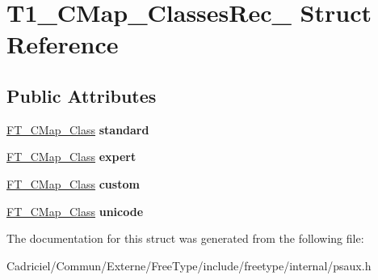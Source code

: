 \hypertarget{struct_t1___c_map___classes_rec__}{}\section{T1\+\_\+\+C\+Map\+\_\+\+Classes\+Rec\+\_\+ Struct Reference}
\label{struct_t1___c_map___classes_rec__}
\subsection*{Public Attributes}
\begin{DoxyCompactItemize}
\item 
\hyperlink{struct_f_t___c_map___class_rec__}{F\+T\+\_\+\+C\+Map\+\_\+\+Class} {\bfseries standard}\hypertarget{struct_t1___c_map___classes_rec___a11bc9e986af1c0cf91bd67e2e30028ca}{}\label{struct_t1___c_map___classes_rec___a11bc9e986af1c0cf91bd67e2e30028ca}

\item 
\hyperlink{struct_f_t___c_map___class_rec__}{F\+T\+\_\+\+C\+Map\+\_\+\+Class} {\bfseries expert}\hypertarget{struct_t1___c_map___classes_rec___a9576c404d5197dd66498725eacde1302}{}\label{struct_t1___c_map___classes_rec___a9576c404d5197dd66498725eacde1302}

\item 
\hyperlink{struct_f_t___c_map___class_rec__}{F\+T\+\_\+\+C\+Map\+\_\+\+Class} {\bfseries custom}\hypertarget{struct_t1___c_map___classes_rec___a21378ef457d58cc00f357011f45fba5e}{}\label{struct_t1___c_map___classes_rec___a21378ef457d58cc00f357011f45fba5e}

\item 
\hyperlink{struct_f_t___c_map___class_rec__}{F\+T\+\_\+\+C\+Map\+\_\+\+Class} {\bfseries unicode}\hypertarget{struct_t1___c_map___classes_rec___aab1eef66893dd7b0d25897612d056d4a}{}\label{struct_t1___c_map___classes_rec___aab1eef66893dd7b0d25897612d056d4a}

\end{DoxyCompactItemize}


The documentation for this struct was generated from the following file\+:\begin{DoxyCompactItemize}
\item 
Cadriciel/\+Commun/\+Externe/\+Free\+Type/include/freetype/internal/psaux.\+h\end{DoxyCompactItemize}
